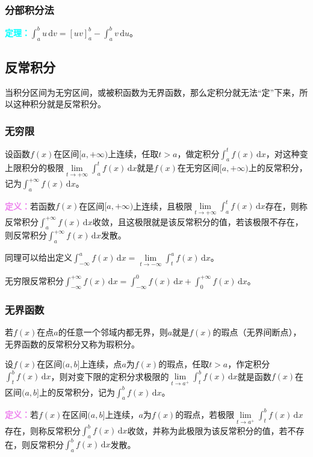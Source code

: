 \documentclass[UTF8, 12pt]{ctexart}
\begin{document}
\subsubsection{分部积分法}

\textcolor{aqua}{\textbf{定理：}}$\int_a^bu\,\textrm{d}v=[uv]_a^b-\int_a^bv\,\textrm{d}u$。

\subsection{反常积分}

当积分区间为无穷区间，或被积函数为无界函数，那么定积分就无法“定”下来，所以这种积分就是反常积分。

\subsubsection{无穷限}

设函数$f(x)$在区间$[a,+\infty)$上连续，任取$t>a$，做定积分$\int_a^tf(x)\,\textrm{d}x$，对这种变上限积分的极限$\lim\limits_{t\to+\infty}\int_a^tf(x)\,\textrm{d}x$就是$f(x)$在无穷区间$[a,+\infty)$上的反常积分，记为$\int_a^{+\infty}f(x)\,\textrm{d}x$。

\textcolor{violet}{\textbf{定义：}}若函数$f(x)$在区间$[a,+\infty)$上连续，且极限$\lim\limits_{t\to+\infty}\int_a^tf(x)\,\textrm{d}x$存在，则称反常积分$\int_a^{+\infty}f(x)\,\textrm{d}x$收敛，且这极限就是该反常积分的值，若该极限不存在，则反常积分$\int_a^{+\infty}f(x)\,\textrm{d}x$发散。

同理可以给出定义$\int_{-\infty}^af(x)\,\textrm{d}x=\lim\limits_{t\to-\infty}\int_t^af(x)\,\textrm{d}x$。

无穷限反常积分$\int_{-\infty}^{+\infty}f(x)\,\textrm{d}x=\int_{-\infty}^0f(x)\,\textrm{d}x+\int_0^{+\infty}f(x)\,\textrm{d}x$。

\subsubsection{无界函数}

若$f(x)$在点$a$的任意一个邻域内都无界，则$a$就是$f(x)$的瑕点（无界间断点），无界函数的反常积分又称为瑕积分。

设$f(x)$在区间$(a,b]$上连续，点$a$为$f(x)$的瑕点，任取$t>a$，作定积分$\int_t^bf(x)\,\textrm{d}x$，则对变下限的定积分求极限的$\lim\limits_{t\to a^+}\int_t^bf(x)\,\textrm{d}x$就是函数$f(x)$在区间$(a,b]$上的反常积分，记为$\int_a^bf(x)\,\textrm{d}x$。

\textcolor{violet}{\textbf{定义：}}若$f(x)$在区间$(a,b]$上连续，$a$为$f(x)$的瑕点，若极限$\lim\limits_{t\to a^+}\int_t^bf(x)\,\textrm{d}x$存在，则称反常积分$\int_a^bf(x)\,\textrm{d}x$收敛，并称为此极限为该反常积分的值，若不存在，则反常积分$\int_a^bf(x)\,\textrm{d}x$发散。
\end{document}
